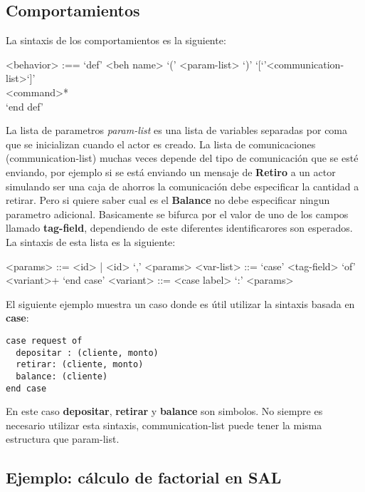 \documentclass[fleqn]{article}
\begin{document}
\subsection{Comportamientos}

La sintaxis de los comportamientos es la siguiente:

\begin{grammar}
  <behavior> :== `def' <beh name> `(' <param-list> `)' `[`'<communication-list>`]' \\
            <command>* \\
  `end def'
\end{grammar}

La lista de parametros \textit{param-list} es una lista de variables separadas por coma
que se inicializan cuando el actor es creado. La lista de comunicaciones (communication-list)
muchas veces depende del tipo de comunicación que se esté enviando, por ejemplo
si se está enviando un mensaje de \textbf{Retiro} a un actor simulando ser una
caja de ahorros la comunicación debe especificar la cantidad a retirar. Pero si
quiere saber cual es el \textbf{Balance} no debe especificar ningun parametro
adicional.
Basicamente se bifurca por el valor de uno de los campos llamado
\textbf{tag-field}, dependiendo de este diferentes identificarores son esperados.
La sintaxis de esta lista es la siguiente:

\begin{grammar}
  <params> ::= <id> | <id> `,' <params>
  <var-list> ::= `case' <tag-field> `of' <variant>+ `end case'
  <variant> ::= <case label> `:' <params>
\end{grammar}

El siguiente ejemplo muestra un caso donde es útil utilizar la sintaxis basada
en \textbf{case}:

\begin{lstlisting}[language=sal, style=simple]
case request of 
  depositar : (cliente, monto) 
  retirar: (cliente, monto) 
  balance: (cliente) 
end case
\end{lstlisting}

En este caso \textbf{depositar}, \textbf{retirar} y \textbf{balance} son
simbolos. 
No siempre es necesario utilizar esta sintaxis, communication-list puede tener
la misma estructura que param-list.

\subsection{Ejemplo: cálculo de factorial en SAL}
\end{document}
